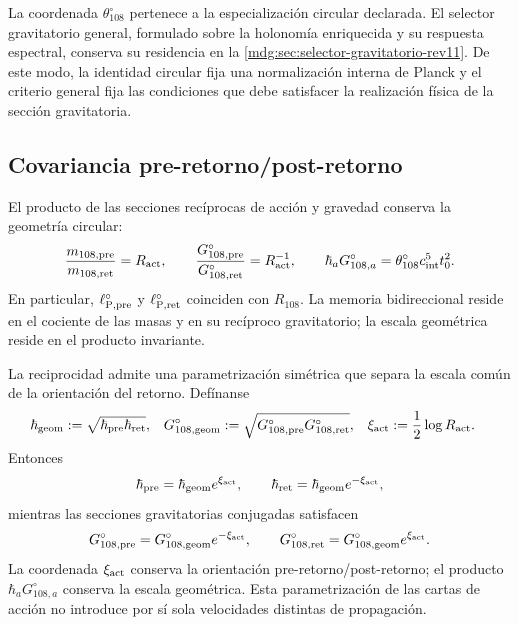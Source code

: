 La coordenada \(\theta_{108}^{\circ}\) pertenece a la especialización
circular declarada. El selector gravitatorio general, formulado sobre la
holonomía enriquecida y su respuesta espectral, conserva su residencia en
la \cref{mdg:sec:selector-gravitatorio-rev11}. De este modo, la identidad
circular fija una normalización interna de Planck y el criterio general
fija las condiciones que debe satisfacer la realización física de la
sección gravitatoria.

\subsection{Covariancia pre-retorno/post-retorno}

El producto de las secciones recíprocas de acción y gravedad conserva la
geometría circular:
\begin{equation}
 \frac{m_{108,\rm pre}}{m_{108,\rm ret}}=R_{\rm act},
 \qquad
 \frac{G_{108,\rm pre}^{\circ}}{G_{108,\rm ret}^{\circ}}
 =R_{\rm act}^{-1},
 \qquad
 \hbar_a G_{108,a}^{\circ}
 =\theta_{108}^{\circ}c_{\rm int}^{5}t_0^2.
 \label{mdg:eq:planck-ct108-covariancia-pre-ret-rev3}
\end{equation}
En particular, \(\ell_{{\rm P},\rm pre}^{\circ}\) y
\(\ell_{{\rm P},\rm ret}^{\circ}\) coinciden con \(R_{108}\). La memoria
bidireccional reside en el cociente de las masas y en su recíproco
gravitatorio; la escala geométrica reside en el producto invariante.

La reciprocidad admite una parametrización simétrica que separa la escala
común de la orientación del retorno. Defínanse
\begin{equation}
 \begin{aligned}
 \hbar_{\rm geom}
 &:=\sqrt{\hbar_{\rm pre}\hbar_{\rm ret}},
 &
 G_{108,\rm geom}^{\circ}
 &:=\sqrt{G_{108,\rm pre}^{\circ}G_{108,\rm ret}^{\circ}},
 &
 \xi_{\rm act}&:=\frac12\log R_{\rm act}.
 \end{aligned}
 \label{mdg:eq:planck-ct108-parametrizacion-simetrica-rev3}
\end{equation}
Entonces
\[
 \hbar_{\rm pre}=\hbar_{\rm geom}e^{\xi_{\rm act}},
 \qquad
 \hbar_{\rm ret}=\hbar_{\rm geom}e^{-\xi_{\rm act}},
\]
mientras las secciones gravitatorias conjugadas satisfacen
\[
 G_{108,\rm pre}^{\circ}
 =G_{108,\rm geom}^{\circ}e^{-\xi_{\rm act}},
 \qquad
 G_{108,\rm ret}^{\circ}
 =G_{108,\rm geom}^{\circ}e^{\xi_{\rm act}}.
\]
La coordenada \(\xi_{\rm act}\) conserva la orientación
pre-retorno/post-retorno; el producto \(\hbar_aG_{108,a}^{\circ}\)
conserva la escala geométrica. Esta parametrización de las cartas de acción
no introduce por sí sola velocidades distintas de propagación.

